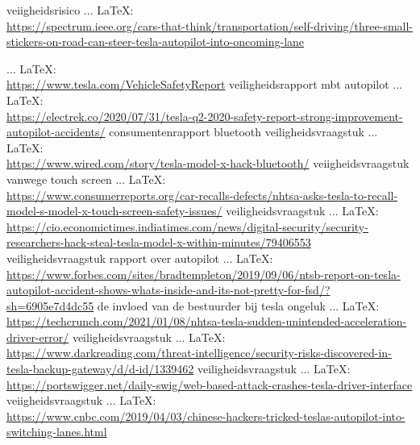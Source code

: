 \begin{thebibliography}{99}
veiigheidsrisico
 ... \LaTeX:\\ \url{https://spectrum.ieee.org/cars-that-think/transportation/self-driving/three-small-stickers-on-road-can-steer-tesla-autopilot-into-oncoming-lane}

 ... \LaTeX:\\ \url{https://www.tesla.com/VehicleSafetyReport}
veiligheidsrapport mbt autopilot
 ... \LaTeX:\\ \url{https://electrek.co/2020/07/31/tesla-q2-2020-safety-report-strong-improvement-autopilot-accidents/}
consumentenrapport
bluetooth veiligheidsvraagstuk
 ... \LaTeX:\\ \url{https://www.wired.com/story/tesla-model-x-hack-bluetooth/}
veiigheidsvraagstuk vanwege touch screen
 ... \LaTeX:\\ \url{https://www.consumerreports.org/car-recalls-defects/nhtsa-asks-tesla-to-recall-model-s-model-x-touch-screen-safety-issues/}
veiligheidsvraagstuk
 ... \LaTeX:\\ \url{https://cio.economictimes.indiatimes.com/news/digital-security/security-researchers-hack-steal-tesla-model-x-within-minutes/79406553}
veiligheidsvraagstuk
rapport over autopilot
 ... \LaTeX:\\ \url{https://www.forbes.com/sites/bradtempleton/2019/09/06/ntsb-report-on-tesla-autopilot-accident-shows-whats-inside-and-its-not-pretty-for-fsd/?sh=6905e7d4dc55}
de invloed van de bestuurder bij tesla ongeluk
 ... \LaTeX:\\ \url{https://techcrunch.com/2021/01/08/nhtsa-tesla-sudden-unintended-acceleration-driver-error/}
veiligheidsvraagstuk
 ... \LaTeX:\\ \url{https://www.darkreading.com/threat-intelligence/security-risks-discovered-in-tesla-backup-gateway/d/d-id/1339462}
veiligheidsvraagstuk
 ... \LaTeX:\\ \url{https://portswigger.net/daily-swig/web-based-attack-crashes-tesla-driver-interface}
veiigheidsvraagstuk
 ... \LaTeX:\\ \url{https://www.cnbc.com/2019/04/03/chinese-hackers-tricked-teslas-autopilot-into-switching-lanes.html}

\end{thebibliography}
